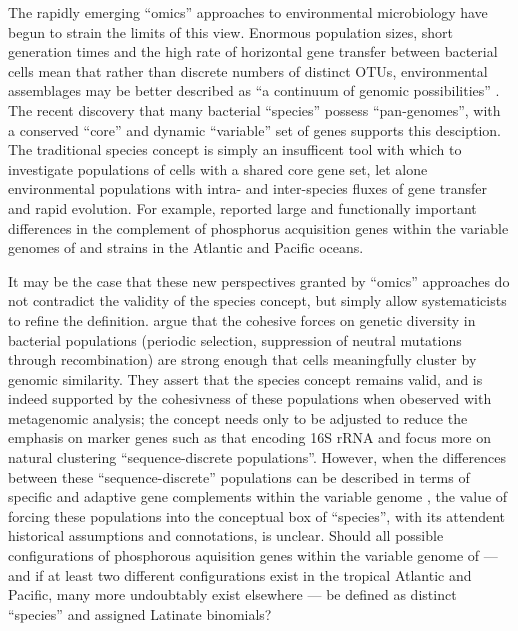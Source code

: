 The rapidly emerging ``omics'' approaches to environmental microbiology have begun to strain the limits of this view.
Enormous population sizes, short generation times and the high rate of horizontal gene transfer between bacterial cells mean that rather than discrete numbers of distinct \acp{OTU}, environmental assemblages may be better described as ``a continuum of genomic possibilities'' \cite{Goldenfeld:2007im}.
The recent discovery that many bacterial ``species'' possess ``pan-genomes'', with a conserved ``core'' and dynamic ``variable'' set of genes \cite{Tettelin:2005jg} supports this desciption.
The traditional species concept is simply an insufficent tool with which to investigate populations of cells with a shared core gene set, let alone environmental populations with intra- and inter-species fluxes of gene transfer and rapid evolution.
For example, \citet{Coleman:2010jj} reported large and functionally important differences in the complement of phosphorus acquisition genes within the variable genomes of  and  strains in the Atlantic and Pacific oceans.

It may be the case that these new perspectives granted by ``omics'' approaches do not contradict the validity of the species concept, but simply allow systematicists to refine the definition.
\citet{CaroQuintero:2011jv} argue that the cohesive forces on genetic diversity in bacterial populations (periodic selection, suppression of neutral mutations through recombination) are strong enough that cells meaningfully cluster by genomic similarity.
They assert that the species concept remains valid, and is indeed supported by the cohesivness of these populations when obeserved with metagenomic analysis; the concept needs only to be adjusted to reduce the emphasis on marker genes such as that encoding 16S rRNA and focus more on natural clustering ``sequence-discrete populations''.
However, when the differences between these ``sequence-discrete'' populations can be described in terms of specific and adaptive gene complements within the variable genome \citep[as in][]{Coleman:2010jj}, the value of forcing these populations into the conceptual box of ``species'', with its attendent historical assumptions and connotations, is unclear.
Should all possible configurations of phosphorous aquisition genes within the variable genome of  --- and if at least two different configurations exist in the tropical Atlantic and Pacific, many more undoubtably exist elsewhere --- be defined as distinct ``species'' and assigned Latinate binomials?

